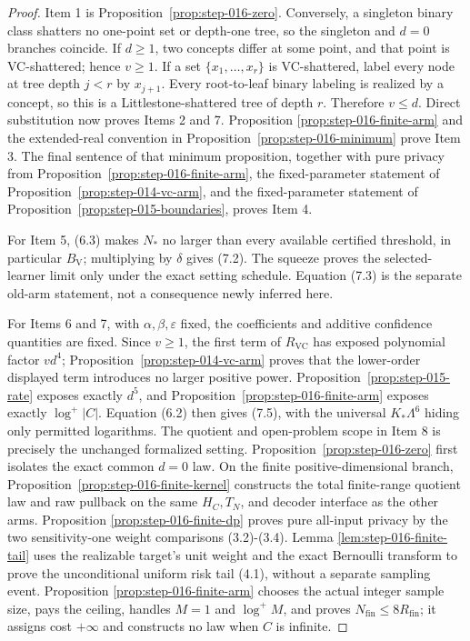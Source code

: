 \begin{proof}
Item 1 is Proposition~\ref{prop:step-016-zero}. Conversely, a
singleton binary class shatters no one-point set or depth-one tree, so the
singleton and \(d=0\) branches coincide. If \(d\ge1\), two concepts differ
at some point, and that point is VC-shattered; hence \(v\ge1\). If a set
\(\{x_1,\ldots,x_r\}\) is VC-shattered, label every node at tree depth
\(j<r\) by \(x_{j+1}\). Every root-to-leaf binary labeling is realized by
a concept, so this is a Littlestone-shattered tree of depth \(r\). Therefore
\(v\le d\). Direct substitution now proves Items 2 and 7. Proposition
\ref{prop:step-016-finite-arm} and the extended-real convention in
Proposition~\ref{prop:step-016-minimum} prove Item 3. The final sentence of
that minimum proposition, together with pure privacy from
Proposition~\ref{prop:step-016-finite-arm}, the fixed-parameter statement of
Proposition~\ref{prop:step-014-vc-arm}, and the fixed-parameter
statement of Proposition~\ref{prop:step-015-boundaries}, proves
Item 4.

For Item 5, (6.3) makes \(N_*\) no larger than every available certified
threshold, in particular \(B_{\mathrm V}\); multiplying by \(\delta\) gives
(7.2). The squeeze proves the selected-learner limit only under the exact
setting schedule. Equation (7.3) is the separate old-arm statement,
not a consequence newly inferred here.

For Items 6 and 7, with \(\alpha,\beta,\varepsilon\) fixed, the coefficients
and additive confidence quantities are fixed. Since \(v\ge1\), the first
term of \(R_{\mathrm{VC}}\) has exposed polynomial factor \(vd^4\); Proposition~\ref{prop:step-014-vc-arm} proves that the lower-order displayed
term introduces no larger positive power. Proposition~\ref{prop:step-015-rate} exposes exactly \(d^5\), and
Proposition~\ref{prop:step-016-finite-arm} exposes exactly
\(\log^+|C|\). Equation (6.2) then gives (7.5), with the universal
\(K_*\Lambda^6\) hiding only permitted logarithms. The quotient and
open-problem scope in Item 8 is precisely the unchanged formalized setting.
Proposition~\ref{prop:step-016-zero} first isolates the exact common
\(d=0\) law. On the finite positive-dimensional branch,
Proposition~\ref{prop:step-016-finite-kernel} constructs the total
finite-range quotient law and raw pullback on the same \(H_C,T_N\), and
decoder interface as the other arms. Proposition
\ref{prop:step-016-finite-dp} proves pure all-input privacy by the two
sensitivity-one weight comparisons (3.2)-(3.4). Lemma
\ref{lem:step-016-finite-tail} uses the realizable target's unit weight and
the exact Bernoulli transform to prove the unconditional uniform risk tail
(4.1), without a separate sampling event. Proposition
\ref{prop:step-016-finite-arm} chooses the actual integer sample size, pays
the ceiling, handles \(M=1\) and \(\log^+M\), and proves
\(N_{\mathrm{fin}}\le8R_{\mathrm{fin}}\); it assigns cost \(+\infty\) and
constructs no law when \(C\) is infinite.


\end{proof}
